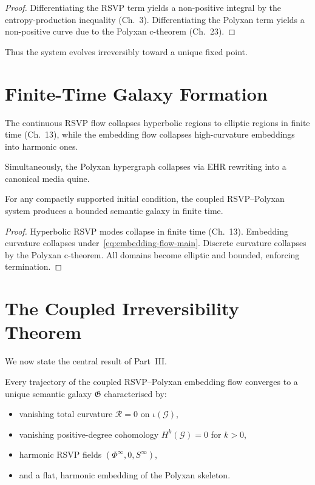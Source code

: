 \begin{proof}
Differentiating the RSVP term yields a non-positive integral by the
entropy-production inequality (Ch.~3).  
Differentiating the Polyxan term yields a non-positive curve due to the
Polyxan c-theorem (Ch.~23).
\end{proof}

Thus the system evolves irreversibly toward a unique fixed point.

\section{Finite-Time Galaxy Formation}

The continuous RSVP flow collapses hyperbolic regions to elliptic
regions in finite time (Ch.~13), while the embedding flow collapses
high-curvature embeddings into harmonic ones.

Simultaneously, the Polyxan hypergraph collapses via EHR rewriting into
a canonical media quine.

\begin{theorem}
\label{thm:galaxy-formation}
For any compactly supported initial condition, the coupled
RSVP–Polyxan system produces a bounded semantic galaxy in finite time.
\end{theorem}

\begin{proof}
Hyperbolic RSVP modes collapse in finite time (Ch.~13).  
Embedding curvature collapses under~\eqref{eq:embedding-flow-main}.  
Discrete curvature collapses by the Polyxan c-theorem.  
All domains become elliptic and bounded, enforcing termination.
\end{proof}

\section{The Coupled Irreversibility Theorem}

We now state the central result of Part~III.

\begin{theorem}
Every trajectory of the coupled RSVP–Polyxan embedding flow converges to
a unique semantic galaxy $\mathfrak{G}$ characterised by:
\begin{itemize}
\item vanishing total curvature $\mathcal{R}=0$ on $\iota(\mathcal{G})$,  
\item vanishing positive-degree cohomology $H^k(\mathcal{G})=0$ for $k>0$,  
\item harmonic RSVP fields $(\Phi^\infty,0,S^\infty)$,  
\item and a flat, harmonic embedding of the Polyxan skeleton.
\end{itemize}
\end{theorem}

